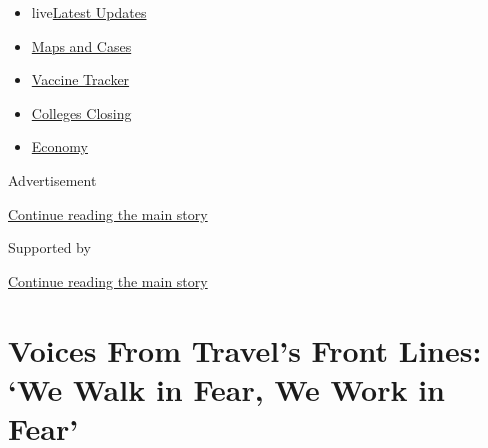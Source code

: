 \begin{itemize}
\tightlist
\item
  live\href{https://www.nytimes3xbfgragh.onion/2020/08/21/world/covid-19-coronavirus.html?name=styln-coronavirus-national\&region=TOP_BANNER\&variant=undefined\&block=storyline_menu_recirc\&action=click\&pgtype=Article\&impression_id=161a0f51-e3af-11ea-918c-0f8207e68c04}{Latest
  Updates}
\item
  \href{https://www.nytimes3xbfgragh.onion/interactive/2020/us/coronavirus-us-cases.html?name=styln-coronavirus-national\&region=TOP_BANNER\&variant=undefined\&block=storyline_menu_recirc\&action=click\&pgtype=Article\&impression_id=161a0f52-e3af-11ea-918c-0f8207e68c04}{Maps
  and Cases}
\item
  \href{https://www.nytimes3xbfgragh.onion/interactive/2020/science/coronavirus-vaccine-tracker.html?name=styln-coronavirus-national\&region=TOP_BANNER\&variant=undefined\&block=storyline_menu_recirc\&action=click\&pgtype=Article\&impression_id=161a0f53-e3af-11ea-918c-0f8207e68c04}{Vaccine
  Tracker}
\item
  \href{https://www.nytimes3xbfgragh.onion/2020/08/19/us/colleges-closing-covid.html?name=styln-coronavirus-national\&region=TOP_BANNER\&variant=undefined\&block=storyline_menu_recirc\&action=click\&pgtype=Article\&impression_id=161a0f54-e3af-11ea-918c-0f8207e68c04}{Colleges
  Closing}
\item
  \href{https://www.nytimes3xbfgragh.onion/live/2020/08/21/business/stock-market-today-coronavirus?name=styln-coronavirus-national\&region=TOP_BANNER\&variant=undefined\&block=storyline_menu_recirc\&action=click\&pgtype=Article\&impression_id=161a0f55-e3af-11ea-918c-0f8207e68c04}{Economy}
\end{itemize}

Advertisement

\protect\hyperlink{after-top}{Continue reading the main story}

Supported by

\protect\hyperlink{after-sponsor}{Continue reading the main story}

\hypertarget{voices-from-travels-front-lines-we-walk-in-fear-we-work-in-fear}{%
\section{Voices From Travel's Front Lines: `We Walk in Fear, We Work in
Fear'}\label{voices-from-travels-front-lines-we-walk-in-fear-we-work-in-fear}}

